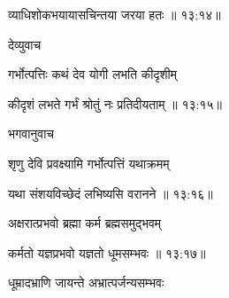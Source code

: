 
{\devanagarifont व्याधिशोकभयायासचिन्तया जरया हतः {॥ १३:१४॥} \veg\dontdisplaylinenum }%


{\devanagarifont देव्युवाच {\dandab}\dontdisplaylinenum  }%
 
{\devanagarifont गर्भोत्पत्तिः कथं देव योगी लभति कीदृशीम् \thinspace{\danda} \dontdisplaylinenum }%


{\devanagarifont कीदृशं लभते गर्भं श्रोतुं नः प्रतिदीयताम् {॥ १३:१५॥} \veg\dontdisplaylinenum }%

{\devanagarifont भगवानुवाच {\dandab}\dontdisplaylinenum  }%
 
{\devanagarifont शृणु देवि प्रवक्ष्यामि गर्भोत्पत्तिं यथाक्रमम् \thinspace{\danda} \dontdisplaylinenum }%


{\devanagarifont यथा संशयविच्छेदं लभिष्यसि वरानने {॥ १३:१६॥} \veg\dontdisplaylinenum }%

{\devanagarifont अक्षरात्प्रभवो ब्रह्मा कर्म ब्रह्मसमुद्भवम् \thinspace{\dandab} \dontdisplaylinenum }%


{\devanagarifont कर्मतो यज्ञप्रभवो यज्ञतो धूमसम्भवः {॥ १३:१७॥} \veg\dontdisplaylinenum }%
 
{\devanagarifont धूम्रादभ्राणि जायन्ते अभ्रात्पर्जन्यसम्भवः  \thinspace{\dandab} \dontdisplaylinenum }%
  
